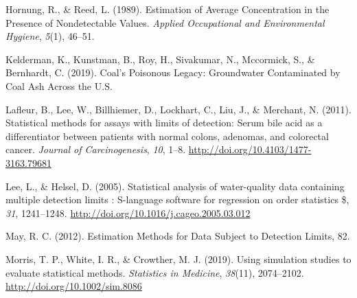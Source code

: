 \documentclass[12pt, twoside]{amherstthesis}
\newlength{\cslhangindent}
\newenvironment{cslreferences}%
  {\setlength{\parindent}{0pt}%
  \everypar{\setlength{\hangindent}{\cslhangindent}}\ignorespaces}%
  {\par}
\begin{document}
\begin{cslreferences}
\leavevmode\hypertarget{ref-Hornung1989}{}%
Hornung, R., \& Reed, L. (1989). Estimation of Average Concentration in the Presence of Nondetectable Values. \emph{Applied Occupational and Environmental Hygiene}, \emph{5}(1), 46--51.

\leavevmode\hypertarget{ref-Kelderman2019}{}%
Kelderman, K., Kunstman, B., Roy, H., Sivakumar, N., Mccormick, S., \& Bernhardt, C. (2019). Coal's Poisonous Legacy: Groundwater Contaminated by Coal Ash Across the U.S.

\leavevmode\hypertarget{ref-Lafleur2011}{}%
Lafleur, B., Lee, W., Billhiemer, D., Lockhart, C., Liu, J., \& Merchant, N. (2011). Statistical methods for assays with limits of detection: Serum bile acid as a differentiator between patients with normal colons, adenomas, and colorectal cancer. \emph{Journal of Carcinogenesis}, \emph{10}, 1--8. \url{http://doi.org/10.4103/1477-3163.79681}

\leavevmode\hypertarget{ref-Lee2005}{}%
Lee, L., \& Helsel, D. (2005). Statistical analysis of water-quality data containing multiple detection limits : S-language software for regression on order statistics \$, \emph{31}, 1241--1248. \url{http://doi.org/10.1016/j.cageo.2005.03.012}

\leavevmode\hypertarget{ref-May2012}{}%
May, R. C. (2012). Estimation Methods for Data Subject to Detection Limits, 82.

\leavevmode\hypertarget{ref-Morris2019}{}%
Morris, T. P., White, I. R., \& Crowther, M. J. (2019). Using simulation studies to evaluate statistical methods. \emph{Statistics in Medicine}, \emph{38}(11), 2074--2102. \url{http://doi.org/10.1002/sim.8086}
\end{cslreferences}
\end{document}
